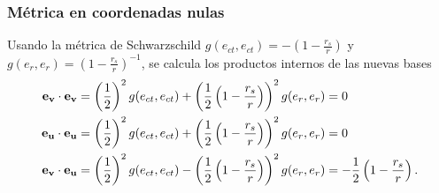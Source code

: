 \subsubsection{Métrica en coordenadas nulas}

Usando la métrica de Schwarzschild \( g(e_{ct},e_{ct}) = -\left(1-\frac{r_s}{r}\right) \) y \( g(e_r,e_r) = \left(1-\frac{r_s}{r}\right)^{-1} \), se calcula los productos internos de las nuevas bases
\begin{equation}
    \begin{aligned}
        \mathbf{ e_v }\cdot \mathbf{e_v} & = \left(\frac{1}{2}\right)^2 g(e_{ct},e_{ct}) + \left(\frac{1}{2}\left(1-\frac{r_s}{r}\right)\right)^2 g(e_r,e_r) = 0                                         \\
        \mathbf{ e_u }\cdot \mathbf{e_u} & = \left(\frac{1}{2}\right)^2 g(e_{ct},e_{ct}) + \left(\frac{1}{2}\left(1-\frac{r_s}{r}\right)\right)^2 g(e_r,e_r) = 0                                         \\
        \mathbf{ e_v }\cdot \mathbf{e_u} & = \left(\frac{1}{2}\right)^2 g(e_{ct},e_{ct}) - \left(\frac{1}{2}\left(1-\frac{r_s}{r}\right)\right)^2 g(e_r,e_r) = -\frac{1}{2}\left(1-\frac{r_s}{r}\right).
    \end{aligned}
\end{equation}
